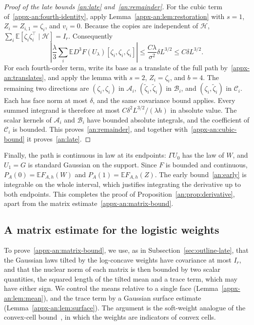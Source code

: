 \documentclass[11pt,letterpaper]{article}
\newif\ifshowrev
\newenvironment{revblock}{\ifshowrev\color{revblue}%
\hypersetup{linkcolor=revblue,citecolor=revblue,urlcolor=revblue}\fi}{}
\newif\ifshowtrim
\newcommand{\trim}[1]{\ifshowtrim{\color{revblue}%
\hypersetup{linkcolor=revblue,citecolor=revblue,urlcolor=revblue}#1}\else#1\fi}
\newif\ifshownat
\newcommand{\nat}[1]{\ifshownat{\color{revblue}%
\hypersetup{linkcolor=revblue,citecolor=revblue,urlcolor=revblue}#1}\else#1\fi}
\theoremstyle{remark}
\newcommand{\E}{\mathbb E}
\begin{document}
\begin{revblock}
\begin{proof}[Proof of the late bounds \eqref{an:late}
and~\eqref{an:remainder}]
For the cubic term of~\eqref{appx-an:fourth-identity}, apply
Lemma~\ref{appx-an:lem:restoration} with \(s=1\),
\(Z_i=Z_{i,1}=\zeta_i\), and \(v_i=0\). Because the copies are \trim{independent of \(\mathcal H\)},
\(\sum_i\E[\zeta_i\zeta_i^\top\mid\mathcal H]=I_r\). Consequently
\begin{equation}
 \left|\frac\lambda3\sum_i\E D^3F(U_\lambda)
                    [\zeta_i,\zeta_i,\zeta_i]\right|
 \le\frac{C\lambda}{\sigma^2}\delta L^{3/2}
 \le C\delta L^{3/2}.
 \label{appx-an:cubic-bound}
\end{equation}
For each fourth-order term, write its base as a translate of the full path
by~\eqref{appx-an:translates}, and apply the lemma with \(s=2\),
\(Z_i=\zeta_i\), and \(b=4\). The remaining two directions are
\((\zeta_i,\zeta_i)\) in \(\mathcal A_i\),
\((\widetilde\zeta_i,\widetilde\zeta_i)\) in \(\mathcal B_i\), and
\((\zeta_i,\widetilde\zeta_i)\) in \(\mathcal C_i\). Each has face norm
at most \(\delta\), and the same covariance \trim{bound} applies. Every summed
integrand is therefore at most \(C\delta^2L^{3/2}/(\lambda h)\) in
absolute value. The scalar kernels of \(\mathcal A_i\) and
\(\mathcal B_i\) have bounded absolute integrals, and the coefficient of
\(\mathcal C_i\) is bounded. This proves~\eqref{an:remainder}, and
together with~\eqref{appx-an:cubic-bound} it proves~\eqref{an:late}.
\end{proof}

Finally, the path is continuous in law at its endpoints: \(\Gamma U_0\)
has the law of \(W\), and \(U_1=G\) is standard Gaussian on the support.
Since \(F\) is bounded and continuous, \(P_A(0)=\E F_{A,h}(W)\) and
\(P_A(1)=\E F_{A,h}(Z)\). The early bound~\eqref{an:early} is integrable
on the whole interval, which justifies integrating the derivative up to
both endpoints. This completes the proof of
Proposition~\ref{an:prop:derivative}, apart from the matrix
estimate~\eqref{appx-an:matrix-bound}.

\subsection{A matrix estimate for the logistic weights}
\label{appx-an:sec:matrix}

To prove~\eqref{appx-an:matrix-bound}, we use, as in
Subsection~\ref{sec:outline-late}, that the Gaussian laws tilted by the
log-concave weights have covariance at most \(I_r\),
and that the nuclear norm of each matrix is then bounded by two scalar
quantities, the squared length of the tilted mean and a \trim{trace
term, which may have either sign}.
We control the means relative to a single face
(Lemma~\ref{appx-an:lem:mean}), and the \trim{trace term} by a Gaussian
surface estimate (Lemma~\ref{appx-an:lem:surface}). The argument is the
soft-weight analogue of the \nat{convex-cell bound}~\cite[Lemma~12]{GaoZhang}, in which the weights are indicators of
convex cells.


\end{revblock}
\end{document}
